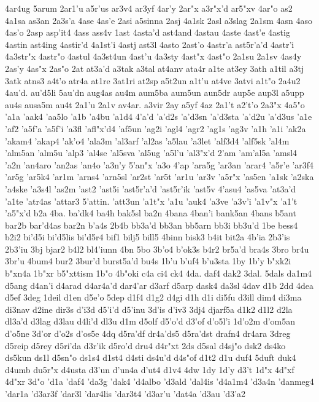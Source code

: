 {4ar4ug
5arum
2ar1'u
a5r'us
ar3v4
ar3yf
4ar'y
2ar"x
a3r"x'd
ar5"xv
4ar"o
as2
4a1sa
as3an
2a3s'a
4ase
4as'e
2asi
a5sinna
2asj
4a1sk
2asl
a3slag
2a1sm
4asn
4aso
4as'o
2asp
asp'it4
4ass
ass4v
1ast
4asta'd
ast4and
4astau
4aste
4ast'e
4astig
4astin
ast4ing
4astir'd
4a1st'i
4astj
ast3l
4asto
2ast'o
4astr'a
ast5r'a'd
4astr'i
4a3str"x
4astr"o
4astul
4a3st4un
4ast'u
4a3sty
4ast"x
4ast"o
2a1su
2a1sv
4as4y
2as'y
4as"x
2as"o
2at
at3a'd
a3tak
a3tal
at4anv
ata4r
a1te
at3ey
3ath
a1til
a3tj
3atk
atns3
a4t'o
atr4a
at1re
3at1ri
at2sp
a5t2un
a1t'u
at4ve
3atvi
a1t"o
2a4u2
4au'd.
au'd5li
5au'dn
aug4as
au4m
aum5ba
aum5un
aun5dr
aup5e
aup3l
a5upp
au4s
ausa5m
au4t
2a1'u
2a1v
av4ar.
a3vir
2ay
a5yf
4az
2a1't
a2't'o
2a3"x
4a5"o
'a1a
'aak4
'aa5lo
'a1b
'a4bu
'a1d4
4'a'd
'a'd2s
'a'd3sn
'a'd3sta
'a'd2u
'a'd3us
'a1e
'af2
'a5f'a
'a5f'i
'a3fl
'afl"x'd4
'af5un
'ag2i
'agl4
'agr2
'ag1s
'ag3v
'a1h
'a1i
'ak2a
'akam4
'akap4
'ak'o4
'ala3m
'al3arf
'al2as
'a5lau
'a3let
'alf3d4
'alf5sk
'al4m
'alm5an
'alm5u
'alp3
'al4se
'al5sva
'al5ug
'a5l'u
'al3"x'd
2'am
'am'al5a
'amsl4
'a2n
'an4aro
'an2as
'an4o
'a3n'y
5'an"x
'a3o
4'ap
'ara5g
'ar3an
'arar4
'a5r'e
'ar3f4
'ar5g
'ar5k4
'ar1m
'arns4
'arn5sl
'ar2st
'ar5t
'ar1u
'ar3v
'a5r"x
'as5en
'a1sk
'a2ska
'a4ske
'a3s4l
'as2m
'ast2
'ast5i
'ast5r'a'd
'ast5r'ik
'ast5v
4'asu4
'as5va
'at3a'd
'a1te
'atr4as
'attar3
5'attin.
'att3un
'a1t"x
'a1u
'auk4
'a3ve
'a3v'i
'a1v"x
'a1't
'a5"x'd
b2a
4ba.
ba'dk4
ba4h
bak5sl
ba2n
4bana
4ban'i
bank5an
4bans
b5ant
bar2b
bar'd4as
bar2n
b'a4s
2b4b
bb3a'd
bb3an
bb5arn
bb3i
bb3u'd
1be
bess4
b2i2
bi'd5i
bi'd5lis
bi'd5r4
bif1
bilj5
bill5
4binn
bisk3
b4it
bit2a
4b'ia
2b3'is
2b3'iu
3bj
bjar2
b4l2
bl4'iunn
4bn
5bo
3b'o4
b'ok3s
b4r2
br5a'd
bra4s
3bro
br4u
3br'u
4bum4
bur2
3bur'd
burst5a'd
bu4s
1b'u
b'uf4
b'u3sta
1by
1b'y
b"xk2i
b"xn4a
1b"xr
b5"xttism
1b"o
4b"oki
c4a
ci4
ck4
4da.
daf4
dak2
3dal.
5dals
da1m4
d5ang
d4an'i
d4arad
d4ar4a'd
dar4'ar
d3arf
d5arp
dask4
da3sl
4dav
d1b
2dd
4dea
d5ef
3deg
1deil
d1en
d5e'o
5dep
d1f4
d1g2
d4gi
d1h
d1i
di5fu
d3ill
dim4
di3ma
di3nav
d2ine
dir3s
d'i3d
d5'i'd
d5'inu
3d'is
d'iv3
3dj4
djarf5a
d1k2
d1l2
d2la
dl3a'd
d3lag
d3lau
d4li'd
dl3u
d1m
d5olf
d5'o'd
d3'of
d'o5l'i
1d'o2m
d'om5an
d'o5ne
3d'or
d'o2s
d'os5e
4dq
d5ra'df
dr4a'ds5
d5ra'dst
drafn4
dr4ara
3dreg
d5reip
d5rey
d5ri'da
d3r'ik
d5ro'd
dru4
d4r"xt
2ds
d5sal
d4sj"o
dsk2
ds4ko
ds5kun
ds1l
d5sn"o
ds1s4
d1st4
d4sti
ds4u'd
d4s"of
d1t2
d1u
duf4
5duft
duk4
d4umb
du5r"x
d4usta
d3'un
d'un4a
d'ut4
d1v4
4dw
1dy
1d'y
d3't
1d"x
4d"xf
4d"xr
3d"o
'd1a
'daf4
'da3g
'dak4
'd4albo
'd3ald
'dal4is
'd4a1m4
'd3a4n
'danmeg4
'dar1a
'd3ar3f
'dar3l
'dar4lis
'dar3t4
'd3ar'u
'dat4a
'd3au
'd3'a2
}
